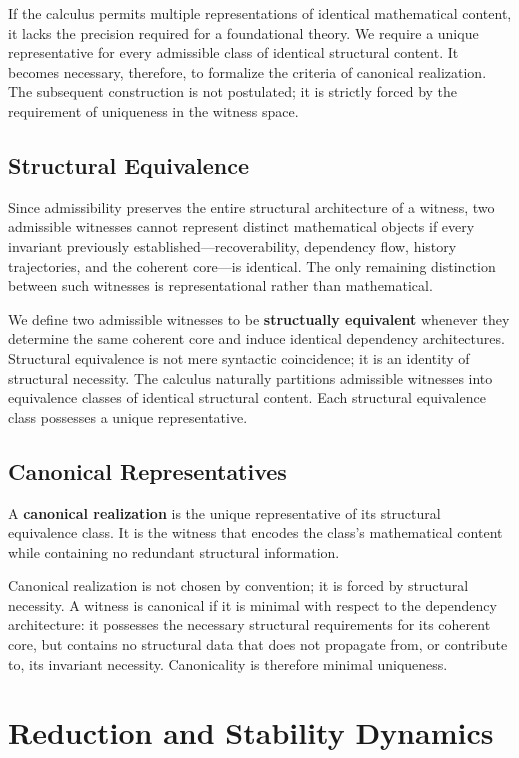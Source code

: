 \documentclass[12pt,anyside]{book}
\begin{document}
If the calculus permits multiple representations of identical mathematical content, it lacks the precision required for a foundational theory. We require a unique representative for every admissible class of identical structural content. It becomes necessary, therefore, to formalize the criteria of canonical realization. The subsequent construction is not postulated; it is strictly forced by the requirement of uniqueness in the witness space.

\subsection{Structural Equivalence}
Since admissibility preserves the entire structural architecture of a witness, two admissible witnesses cannot represent distinct mathematical objects if every invariant previously established—recoverability, dependency flow, history trajectories, and the coherent core—is identical. The only remaining distinction between such witnesses is representational rather than mathematical.

We define two admissible witnesses to be \textbf{structually equivalent} whenever they determine the same coherent core and induce identical dependency architectures. Structural equivalence is not mere syntactic coincidence; it is an identity of structural necessity. The calculus naturally partitions admissible witnesses into equivalence classes of identical structural content. Each structural equivalence class possesses a unique representative.

\subsection{Canonical Representatives}
A \textbf{canonical realization} is the unique representative of its structural equivalence class. It is the witness that encodes the class's mathematical content while containing no redundant structural information.

Canonical realization is not chosen by convention; it is forced by structural necessity. A witness is canonical if it is minimal with respect to the dependency architecture: it possesses the necessary structural requirements for its coherent core, but contains no structural data that does not propagate from, or contribute to, its invariant necessity. Canonicality is therefore minimal uniqueness.

\section{Reduction and Stability Dynamics}
\end{document}
